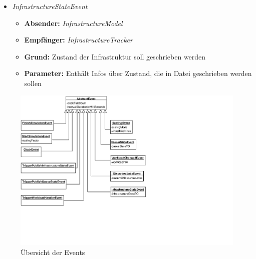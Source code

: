 \begin{itemize}
	\item \textit{InfrastructureStateEvent} 
\begin{itemize}
	\item \textbf{Absender:} \textit{InfrastructureModel}
	\item \textbf{Empfänger:} \textit{InfrastructureTracker}
	\item \textbf{Grund:}  Zustand der Infrastruktur soll geschrieben werden
	\item \textbf{Parameter:} Enthält Infos über Zustand, die in Datei geschrieben werden sollen
\end{itemize} 





\end{itemize}
 

\begin{figure}[!h]
	\centering
	
	\includegraphics[width=20.0cm, trim={0cm 5cm 6cm 0cm}]{img/eventsDiagram.pdf}
	
	\caption{Übersicht der Events}
	\label{fig:eventsDiagram}
\end{figure}




